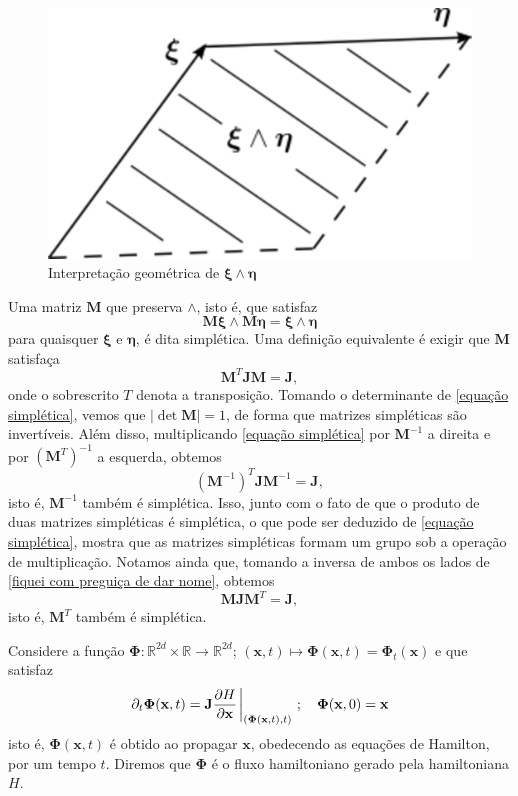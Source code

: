 \documentclass[
	12pt,
	oneside,			%
	a4paper,			%
	english,			%
	brazil				%
	]{abntex2}
\theoremstyle{definition}
\begin{document}
\begin{figure}[H]
    \includegraphics[width=.4\textwidth]{Imagens/paralelogramo.png}
    \centering
    \caption{Interpretação geométrica de $\boldsymbol{\xi}\wedge\boldsymbol{\eta}$}
    \label{a}
\end{figure}

Uma matriz $\mathbf{M}$ que preserva $\wedge$, isto é, que satisfaz
\begin{equation}
    \label{matrizes simpléticas 1}
    \mathbf{M}\boldsymbol{\xi}\wedge\mathbf{M}\boldsymbol{\eta} = \boldsymbol{\xi}\wedge\boldsymbol{\eta}
\end{equation}
para quaisquer $\boldsymbol{\xi}$ e $\boldsymbol{\eta}$, é dita simplética. Uma definição equivalente é exigir que $\mathbf{M}$ satisfaça
\begin{equation}
    \label{equação simplética}
    \mathbf{M}^T \mathbf{J} \mathbf{M} = \mathbf{J},
\end{equation}
onde o sobrescrito $T$ denota a transposição. Tomando o determinante de \eqref{equação simplética}, vemos que $\left| \det \mathbf{M} \right| = 1$, de forma que matrizes simpléticas são invertíveis. Além disso, multiplicando \eqref{equação simplética} por $\mathbf{M}^{-1}$ a direita e por $\left(\mathbf{M}^T\right)^{-1}$ a esquerda, obtemos
\begin{equation}
\label{fiquei com preguiça de dar nome}
    \left(\mathbf{M}^{-1}\right)^T \mathbf{J} \mathbf{M}^{-1} = \mathbf{J},
\end{equation}
isto é, $\mathbf{M}^{-1}$ também é simplética. Isso, junto com o fato de que o produto de duas matrizes simpléticas é simplética, o que pode ser deduzido de \eqref{equação simplética}, mostra que as matrizes simpléticas formam um grupo sob a operação de multiplicação. Notamos ainda que, tomando a inversa de ambos os lados de \eqref{fiquei com preguiça de dar nome}, obtemos 
\begin{equation}
    \label{equação simplética 2}
    \mathbf{M} \mathbf{J} \mathbf{M}^T = \mathbf{J},
\end{equation}
isto é, $\mathbf{M}^T$ também é simplética.

Considere a função $\boldsymbol{\Phi}:\mathbb{R}^{2d}\times\mathbb{R}\to \mathbb{R}^{2d}$; $(\mathbf{x},t) \mapsto \boldsymbol{\Phi}(\mathbf{x},t) = \boldsymbol{\Phi}_t(\mathbf{x})$ e que satisfaz
\begin{equation}
\label{definição fluxo hamiltoniano}
    \partial_t \boldsymbol{\Phi}(\mathbf{x},t) = \mathbf{J} \frac{\partial H}{\partial \mathbf{x}} \eval_{(\boldsymbol{\Phi}(\mathbf{x},t),t)} \ ; \ \ \ \boldsymbol{\Phi}(\mathbf{x},0) = \mathbf{x}
\end{equation}
isto é, $\boldsymbol{\Phi}(\mathbf{x},t)$ é obtido ao propagar $\mathbf{x}$, obedecendo as equações de Hamilton, por um tempo $t$. Diremos que $\boldsymbol{\Phi}$ é o fluxo hamiltoniano gerado pela hamiltoniana $H$.
\end{document}
